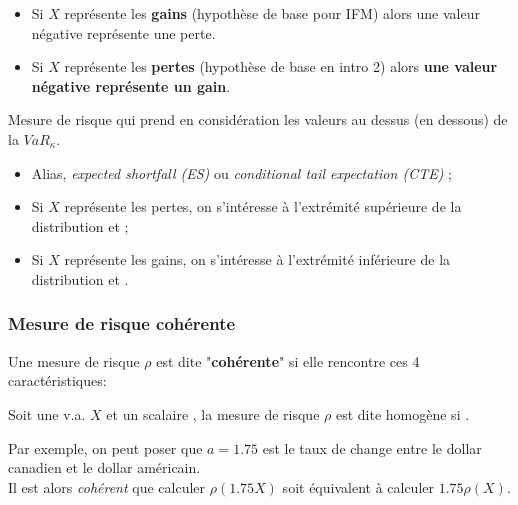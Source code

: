 \documentclass[10pt, french]{article}
\begin{document}
\begin{multicols*}{2}
\begin{definitionNOHFILL}
\begin{itemize}
	\item	Si $X$ représente les \textbf{gains} (hypothèse de base pour IFM) alors une valeur négative représente une perte.
	\item	Si $X$ représente les \textbf{pertes} (hypothèse de base en intro 2) alors \textbf{une valeur négative représente un gain}.
\end{itemize}
\end{definitionNOHFILL}

\begin{definitionNOHFILL}
Mesure de risque qui prend en considération les valeurs au dessus (en dessous) de la $VaR_{\kappa}$.

\begin{itemize}[leftmargin = *]
	\item	Alias, \og \textit{expected shortfall (ES)} \fg{} ou \og \textit{conditional tail expectation (CTE)} \fg{} ;
	\item	Si $X$ représente les pertes, on s'intéresse à l'extrémité supérieure de la distribution et  ;
	\item	Si $X$ représente les gains, on s'intéresse à l'extrémité inférieure de la distribution et .
\end{itemize}
\end{definitionNOHFILL}


\columnbreak
\subsubsection{Mesure de risque cohérente}
Une mesure de risque $\rho$ est dite "\textbf{cohérente}" si elle rencontre ces 4 caractéristiques:
\begin{definitionNOHFILLsub}[Homogénéité]
Soit une v.a. $X$ et un scalaire , la mesure de risque $\rho$ est dite homogène si .

\begin{rappel_enhanced}[Interprétation]
Par exemple, on peut poser que $a	=	1.75$ est le taux de change entre le dollar canadien et le dollar américain.\\
Il est alors \textit{cohérent} que calculer $\rho(1.75X)$ soit équivalent à calculer $1.75\rho(X)$.
\end{rappel_enhanced}
\end{definitionNOHFILLsub}


\end{multicols*}
\end{document}
